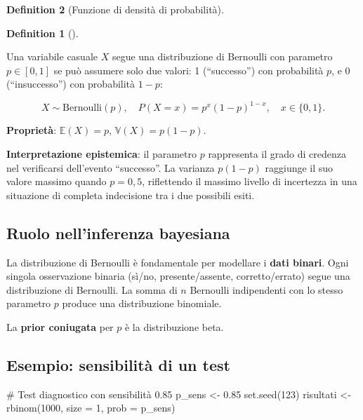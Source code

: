 \documentclass[
  letterpaper,
  DIV=11,
  numbers=noendperiod,
  oneside]{scrreprt}
\newenvironment{Shaded}{\begin{snugshade}}{\end{snugshade}}
\newcommand{\AttributeTok}[1]{\textcolor[rgb]{0.40,0.45,0.13}{#1}}
\newcommand{\CommentTok}[1]{\textcolor[rgb]{0.37,0.37,0.37}{#1}}
\newcommand{\DecValTok}[1]{\textcolor[rgb]{0.68,0.00,0.00}{#1}}
\newcommand{\FloatTok}[1]{\textcolor[rgb]{0.68,0.00,0.00}{#1}}
\newcommand{\FunctionTok}[1]{\textcolor[rgb]{0.28,0.35,0.67}{#1}}
\newcommand{\NormalTok}[1]{\textcolor[rgb]{0.00,0.23,0.31}{#1}}
\newcommand{\OtherTok}[1]{\textcolor[rgb]{0.00,0.23,0.31}{#1}}
\theoremstyle{definition}
\theoremstyle{plain}
\theoremstyle{definition}
\newtheorem{definition}{Definition}[chapter]
\theoremstyle{remark}
\begin{document}
\begin{definition}[Funzione di densità di
probabilità]
\begin{definition}[]\protect\hypertarget{def-bernoulli}{}\label{def-bernoulli}

Una variabile casuale \(X\) segue una distribuzione di Bernoulli con
parametro \(p \in [0,1]\) se può assumere solo due valori: 1
(``successo'') con probabilità \(p\), e 0 (``insuccesso'') con
probabilità \(1-p\):

\[
X \sim \text{Bernoulli}(p), \quad P(X = x) = p^x (1-p)^{1-x}, \quad x \in \{0,1\}.
\]

\textbf{Proprietà}: \(\mathbb{E}(X) = p\), \(\mathbb{V}(X) = p(1-p)\).

\end{definition}

\textbf{Interpretazione epistemica}: il parametro \(p\) rappresenta il
grado di credenza nel verificarsi dell'evento ``successo''. La varianza
\(p(1-p)\) raggiunge il suo valore massimo quando \(p = 0,5\),
riflettendo il massimo livello di incertezza in una situazione di
completa indecisione tra i due possibili esiti.

\subsection{Ruolo nell'inferenza
bayesiana}\label{ruolo-nellinferenza-bayesiana-1}

La distribuzione di Bernoulli è fondamentale per modellare i
\textbf{dati binari}. Ogni singola osservazione binaria (sì/no,
presente/assente, corretto/errato) segue una distribuzione di Bernoulli.
La somma di \(n\) Bernoulli indipendenti con lo stesso parametro \(p\)
produce una distribuzione binomiale.

La \textbf{prior coniugata} per \(p\) è la distribuzione beta.

\subsection{Esempio: sensibilità di un
test}\label{esempio-sensibilituxe0-di-un-test}

\begin{Shaded}
\begin{Highlighting}[]
\CommentTok{\# Test diagnostico con sensibilità 0.85}
\NormalTok{p\_sens }\OtherTok{\textless{}{-}} \FloatTok{0.85}
\FunctionTok{set.seed}\NormalTok{(}\DecValTok{123}\NormalTok{)}
\NormalTok{risultati }\OtherTok{\textless{}{-}} \FunctionTok{rbinom}\NormalTok{(}\DecValTok{1000}\NormalTok{, }\AttributeTok{size =} \DecValTok{1}\NormalTok{, }\AttributeTok{prob =}\NormalTok{ p\_sens)}


\end{Highlighting}
\end{Shaded}
\end{definition}
\end{document}
